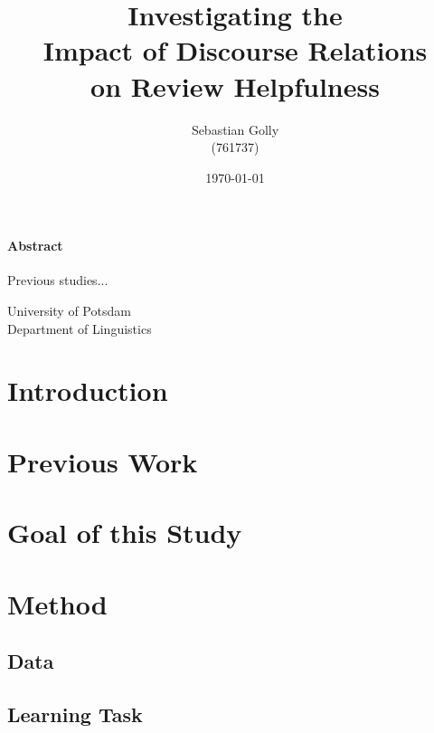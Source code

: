 \documentclass[
    a4paper,%
    12pt,%
    oneside,%
    toc=bibliography,
    final,
]{scrartcl}
\title{Investigating the \\Impact of Discourse Relations\\ on Review Helpfulness}
\subtitle{}
\author{Sebastian Golly\\ {\normalsize (761737)}}
\date{\today}
\begin{document}
\maketitle

\vfill

\paragraph{Abstract}

Previous studies...
\\[3em]

\vfill

\begin{center}
University of Potsdam\\[1.5em]
Department of Linguistics
\end{center}

\thispagestyle{empty}
\newpage


\section{Introduction}



\section{Previous Work}
\label{sec:previous-work}



\section{Goal of this Study}
\label{sec:goal}




\section{Method}
\label{sec:method}


\subsection{Data}


\subsection{Learning Task}
\end{document}
